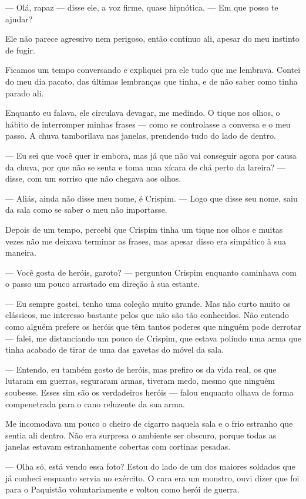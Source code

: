 — Olá, rapaz — disse ele, a voz firme, quase hipnótica. — Em que posso te ajudar?

Ele não parece agressivo nem perigoso, então continuo ali, apesar do meu instinto de fugir.

Ficamos um tempo conversando e expliquei pra ele tudo que me lembrava. Contei do meu dia pacato, das últimas lembranças que tinha, e de não saber como tinha parado ali.

Enquanto eu falava, ele circulava devagar, me medindo. O tique nos olhos, o hábito de interromper minhas frases — como se controlasse a conversa e o meu passo. A chuva tamborilava nas janelas, prendendo tudo do lado de dentro.

— Eu sei que você quer ir embora, mas já que não vai conseguir agora por causa da chuva, por que não se senta e toma uma xícara de chá perto da lareira? — disse, com um sorriso que não chegava aos olhos.

— Aliás, ainda não disse meu nome, é Crispim. — Logo que disse seu nome, saiu da sala como se saber o meu não importasse.

Depois de um tempo, percebi que Crispim tinha um tique nos olhos e muitas vezes não me deixava terminar as frases, mas apesar disso era simpático à sua maneira.

— Você gosta de heróis, garoto? — perguntou Crispim enquanto caminhava com o passo um pouco arrastado em direção à sua estante.

— Eu sempre gostei, tenho uma coleção muito grande. Mas não curto muito os clássicos, me interesso bastante pelos que não são tão conhecidos. Não entendo como alguém prefere os heróis que têm tantos poderes que ninguém pode derrotar — falei, me distanciando um pouco de Crispim, que estava polindo uma arma que tinha acabado de tirar de uma das gavetas do móvel da sala.

— Entendo, eu também gosto de heróis, mas prefiro os da vida real, os que lutaram em guerras, seguraram armas, tiveram medo, mesmo que ninguém soubesse. Esses sim são os verdadeiros heróis — falou enquanto olhava de forma compenetrada para o cano reluzente da sua arma.

Me incomodava um pouco o cheiro de cigarro naquela sala e o frio estranho que sentia ali dentro. Não era surpresa o ambiente ser obscuro, porque todas as janelas estavam estranhamente cobertas com cortinas pesadas.

— Olha só, está vendo essa foto? Estou do lado de um dos maiores soldados que já conheci enquanto servia no exército. O cara era um monstro, ouvi dizer que foi para o Paquistão voluntariamente e voltou como herói de guerra.


